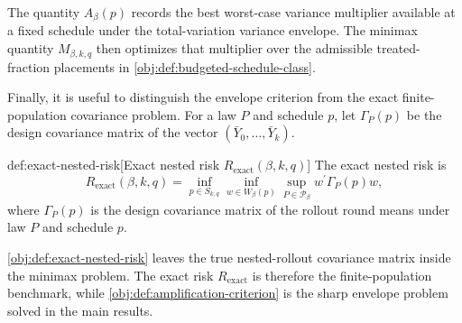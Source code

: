 The quantity \(A_\beta(p)\) records the best worst-case variance multiplier available at a fixed schedule under the total-variation variance envelope. The minimax quantity \(M_{\beta,k,q}\) then optimizes that multiplier over the admissible treated-fraction placements in \cref{obj:def:budgeted-schedule-class}.

Finally, it is useful to distinguish the envelope criterion from the exact finite-population covariance problem. For a law \(P\) and schedule \(p\), let \(\Gamma_P(p)\) be the design covariance matrix of the vector \((\bar Y_0,\ldots,\bar Y_k)\).

\begin{definitionv}{def:exact-nested-risk}[Exact nested risk \(R_{\mathrm{exact}}(\beta,k,q)\)]
The exact nested risk is
\[
R_{\mathrm{exact}}(\beta,k,q)
=
\inf_{p\in S_{k,q}}
\inf_{w\in W_\beta(p)}
\sup_{P\in\mathcal P_\beta}
w^\prime \Gamma_P(p) w,
\]
where \(\Gamma_P(p)\) is the design covariance matrix of the rollout round means under law \(P\) and schedule \(p\).
\end{definitionv}

\cref{obj:def:exact-nested-risk} leaves the true nested-rollout covariance matrix inside the minimax problem. The exact risk \(R_{\mathrm{exact}}\) is therefore the finite-population benchmark, while \cref{obj:def:amplification-criterion} is the sharp envelope problem solved in the main results.
